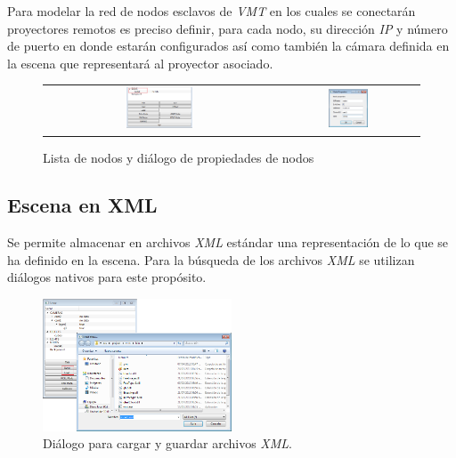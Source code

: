 Para modelar la red de nodos esclavos de \emph{VMT} en los cuales se conectarán proyectores remotos es preciso definir, para cada nodo, su dirección \emph{IP} y número de puerto en donde estarán configurados así como también la cámara definida en la escena que representará al proyector asociado.

\begin{figure}
	\begin{center}
		\begin{tabular}[c]{cc}
			\includegraphics[width=0.3\textwidth]{./Cap5_vmt/vmt_nodeProperties_1.png}
				&        
			\includegraphics[width=0.3\textwidth]{./Cap5_vmt/vmt_nodeProperties_2.png}
		\end{tabular}
	\end{center}
	\caption{Lista de nodos y diálogo de propiedades de nodos}
	\label{fig:VMT-Nodes}
\end{figure}

\subsection{Escena en XML}
Se permite almacenar en archivos \emph{XML} estándar una representación de lo que se ha definido en la escena. Para la búsqueda de los archivos \emph{XML} se utilizan diálogos nativos para este propósito.

\begin{figure}[H]
  \centering
    \includegraphics[width=0.5\textwidth]{./Cap5_vmt/vmt_loadShow.png}
  \caption{Diálogo para cargar y guardar archivos \emph{XML}.}
  \label{fig:VMT-XML}
\end{figure}

